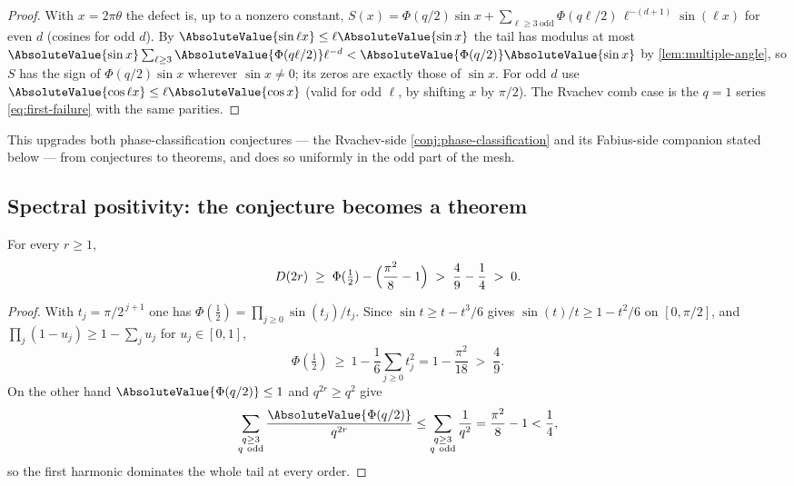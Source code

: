 \begin{proof}
With $x=2\pi\theta$ the defect is, up to a nonzero constant,
$S(x)=\Phi(q/2)\sin x+\sum_{\ell\ge3\ \mathrm{odd}}
\Phi(q\ell/2)\,\ell^{-(d+1)}\sin(\ell x)$ for even $d$ (cosines for
odd $d$).  By $\AbsoluteValue{\sin\ell x}\le\ell\AbsoluteValue{\sin x}$ the tail has
modulus at most
$\AbsoluteValue{\sin x}\sum_{\ell\ge3}\AbsoluteValue{\Phi(q\ell/2)}\ell^{-d}
<\AbsoluteValue{\Phi(q/2)}\AbsoluteValue{\sin x}$ by
\cref{lem:multiple-angle}, so $S$ has the sign of
$\Phi(q/2)\sin x$ wherever $\sin x\ne0$; its zeros are exactly those
of $\sin x$.  For odd $d$ use $\AbsoluteValue{\cos\ell x}\le\ell\AbsoluteValue{\cos x}$
(valid for odd $\ell$, by shifting $x$ by $\pi/2$).  The Rvachev comb
case is the $q=1$ series \eqref{eq:first-failure} with the same
parities.
\end{proof}

This upgrades both phase-classification conjectures --- the
Rvachev-side \cref{conj:phase-classification} and its Fabius-side
companion stated below --- from conjectures to theorems, and does so
uniformly in the odd part of the mesh.

\subsection{Spectral positivity: the conjecture becomes a theorem}

\begin{theorem}
\label{thm:D-positive}
For every $r\ge1$,
\begin{equation}
 D(2r)\;\ge\;\Phi(\tfrac12)-\Bigl(\frac{\pi^{2}}8-1\Bigr)
 \;>\;\frac49-\frac14\;>\;0.
 \label{eq:D-positive}
\end{equation}
\end{theorem}

\begin{proof}
With $t_j=\pi/2^{\,j+1}$ one has
$\Phi(\tfrac12)=\prod_{j\ge0}\sin(t_j)/t_j$.  Since
$\sin t\ge t-t^{3}/6$ gives $\sin(t)/t\ge1-t^{2}/6$ on
$[0,\pi/2]$, and $\prod_j(1-u_j)\ge1-\sum_ju_j$ for
$u_j\in[0,1]$,
\[
 \Phi(\tfrac12)\ \ge\ 1-\frac16\sum_{j\ge0}t_j^{2}
 =1-\frac{\pi^{2}}{18}
 \;>\;\frac49.
\]
On the other hand $\AbsoluteValue{\Phi(q/2)}\le1$ and $q^{2r}\ge q^{2}$ give
\[
 \sum_{\substack{q\ge3\\q\ \mathrm{odd}}}
 \frac{\AbsoluteValue{\Phi(q/2)}}{q^{2r}}
 \le\sum_{\substack{q\ge3\\q\ \mathrm{odd}}}\frac1{q^{2}}
 =\frac{\pi^{2}}8-1<\frac14 ,
\]
so the first harmonic dominates the whole tail at every order.
\end{proof}

